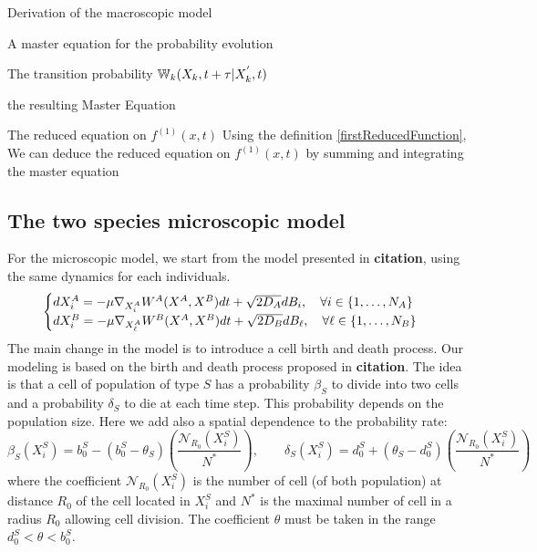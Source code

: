 \begin{paragraph}{Derivation of the macroscopic model}
\begin{paragraph}{A master equation for the probability evolution}
\begin{paragraph}{The transition probability ${\mathbb{W}}_k(X_k, t+\tau \vert X_k^{'},t)$}
\begin{paragraph}{the resulting Master Equation}
\end{paragraph}

\end{paragraph}

\end{paragraph}

\begin{paragraph}{The reduced equation on $f^{(1)}(x,t)$}
Using the definition \eqref{firstReducedFunction}, We can deduce the reduced equation on $f^{(1)}(x,t)$ by summing and integrating the master equation
\end{paragraph}

\end{paragraph}


\subsection{The two species microscopic model}
	For the microscopic model, we start from the model presented in \textbf{citation}, using the same dynamics for each individuals.
	\begin{equation}
	\begin{cases}
	d X_i^{A}=-\mu \nabla_{X_{i}^{A}}W^{A}(X^{A},X^{B})dt + \sqrt{2D_{A}} d B_{i}, \quad \forall i \in\{1, \dots, N_{A}\}
	\\
	d X_i^{B}=-\mu \nabla_{X_{{\ell}}^{A}}W^{B}(X^{A},X^{B})dt + \sqrt{2D_{B}} d B_{{\ell}}, \quad \forall {\ell} \in \{1, \dots, N_{B}\}
	\end{cases}
	\end{equation}
		The main change in the model is to introduce a cell birth and death process. Our modeling is based on the birth and death process proposed in \textbf{citation}. The idea is that a cell of population of type $S$ has a probability $\beta_S$ to divide into two cells and a probability $\delta_S$ to die at each time step. This probability depends on the population size. Here we add also a spatial dependence to the probability rate:
	\begin{equation}
\beta_{S}(X_i^S)=b_{0}^{S}-(b_{0}^{S}-\theta_{S})\left(\frac{\mathcal{N}_{R_0}(X_i^S)}{N^{*}}\right), \quad\quad \delta_{S}(X_i^S)=d_{0}^{S}+(\theta_{S}-d_{0}^{S})\left(\frac{\mathcal{N}_{R_0}(X_i^S)}{N^{*}}\right)
\end{equation}
	where the coefficient $\mathcal{N}_{R_0}(X_i^S)$ is the number of cell (of both population) at distance $R_0$ of the cell located in $X_i^S$ and $N^*$ is the maximal number of cell in a radius $R_0$ allowing cell division. The coefficient $\theta$ must be taken in the range $d_{0}^{S}<\theta<b_{0}^{S}$.


